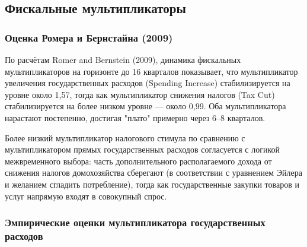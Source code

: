 \documentclass[10pt,a4paper]{article}
\begin{document}
\subsection{Фискальные мультипликаторы}
 
\subsubsection{Оценка Ромера и Бернстайна (2009)}
 
По расчётам Romer and Bernstein (2009), динамика фискальных мультипликаторов на горизонте до 16 кварталов показывает, что мультипликатор увеличения государственных расходов (Spending Increase) стабилизируется на уровне около 1{,}57, тогда как мультипликатор снижения налогов (Tax Cut) стабилизируется на более низком уровне — около 0{,}99. Оба мультипликатора нарастают постепенно, достигая "плато" примерно через 6--8 кварталов.
 
\begin{intuition}
Более низкий мультипликатор налогового стимула по сравнению с мультипликатором прямых государственных расходов согласуется с логикой межвременного выбора: часть дополнительного располагаемого дохода от снижения налогов домохозяйства сберегают (в соответствии с уравнением Эйлера и желанием сгладить потребление), тогда как государственные закупки товаров и услуг напрямую входят в совокупный спрос.
\end{intuition}
 
\subsubsection{Эмпирические оценки мультипликатора государственных расходов}
 
\end{document}
